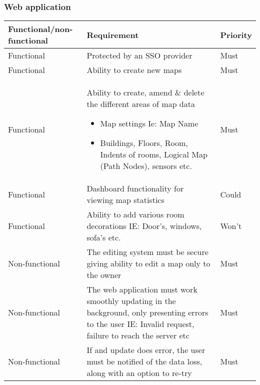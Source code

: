 \subsubsection{Web application}
\begin{tabular}{| p{} | p{} | p{}|}
	\hline
	Functional/non-functional & Requirement & Priority\\\hline
	Functional & Protected by an SSO provider & Must\\\hline
	Functional & Ability to create new maps & Must\\\hline
	Functional & Ability to create, amend \& delete the different areas of map data \begin{itemize}
		\item Map settings Ie: Map Name
		\item Buildings, Floors, Room, Indents of rooms, Logical Map (Path Nodes), sensors etc.
	\end{itemize}& Must\\\hline
	Functional & Dashboard functionality for viewing map statistics & Could \\\hline
	Functional & Ability to add various room decorations IE: Door's, windows, sofa's etc. & Won't\\\hline
	Non-functional & The editing system must be secure giving ability to edit a map only to the owner & Must\\\hline
	Non-functional & The web application must work smoothly updating in the background, only presenting errors to the user IE: Invalid request, failure to reach the server etc & Must\\\hline
	Non-functional & If and update does error, the user must be notified of the data loss, along with an option to re-try & Must\\\hline
\end{tabular}
